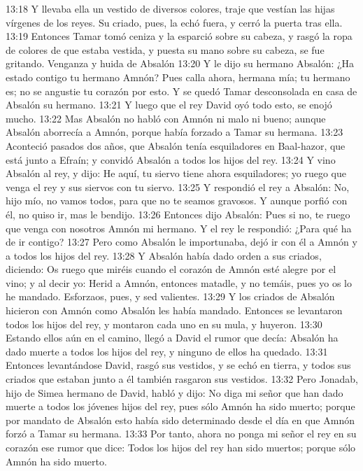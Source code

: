 13:18 Y llevaba ella un vestido de diversos colores, traje que vestían las hijas vírgenes de los reyes. Su criado, pues, la echó fuera, y cerró la puerta tras ella.  
13:19 Entonces Tamar tomó ceniza y la esparció sobre su cabeza, y rasgó la ropa de colores de que estaba vestida, y puesta su mano sobre su cabeza, se fue gritando.  
Venganza y huida de Absalón  
13:20 Y le dijo su hermano Absalón: ¿Ha estado contigo tu hermano Amnón? Pues calla ahora, hermana mía; tu hermano es; no se angustie tu corazón por esto. Y se quedó Tamar desconsolada en casa de Absalón su hermano.  
13:21 Y luego que el rey David oyó todo esto, se enojó mucho.  
13:22 Mas Absalón no habló con Amnón ni malo ni bueno; aunque Absalón aborrecía a Amnón, porque había forzado a Tamar su hermana.  
13:23 Aconteció pasados dos años, que Absalón tenía esquiladores en Baal-hazor, que está junto a Efraín; y convidó Absalón a todos los hijos del rey.  
13:24 Y vino Absalón al rey, y dijo: He aquí, tu siervo tiene ahora esquiladores; yo ruego que venga el rey y sus siervos con tu siervo.  
13:25 Y respondió el rey a Absalón: No, hijo mío, no vamos todos, para que no te seamos gravosos. Y aunque porfió con él, no quiso ir, mas le bendijo.  
13:26 Entonces dijo Absalón: Pues si no, te ruego que venga con nosotros Amnón mi hermano. Y el rey le respondió: ¿Para qué ha de ir contigo?  
13:27 Pero como Absalón le importunaba, dejó ir con él a Amnón y a todos los hijos del rey.  
13:28 Y Absalón había dado orden a sus criados, diciendo: Os ruego que miréis cuando el corazón de Amnón esté alegre por el vino; y al decir yo: Herid a Amnón, entonces matadle, y no temáis, pues yo os lo he mandado. Esforzaos, pues, y sed valientes.  
13:29 Y los criados de Absalón hicieron con Amnón como Absalón les había mandado. Entonces se levantaron todos los hijos del rey, y montaron cada uno en su mula, y huyeron.  
13:30 Estando ellos aún en el camino, llegó a David el rumor que decía: Absalón ha dado muerte a todos los hijos del rey, y ninguno de ellos ha quedado.  
13:31 Entonces levantándose David, rasgó sus vestidos, y se echó en tierra, y todos sus criados que estaban junto a él también rasgaron sus vestidos.  
13:32 Pero Jonadab, hijo de Simea hermano de David, habló y dijo: No diga mi señor que han dado muerte a todos los jóvenes hijos del rey, pues sólo Amnón ha sido muerto; porque por mandato de Absalón esto había sido determinado desde el día en que Amnón forzó a Tamar su hermana.  
13:33 Por tanto, ahora no ponga mi señor el rey en su corazón ese rumor que dice: Todos los hijos del rey han sido muertos; porque sólo Amnón ha sido muerto.  
